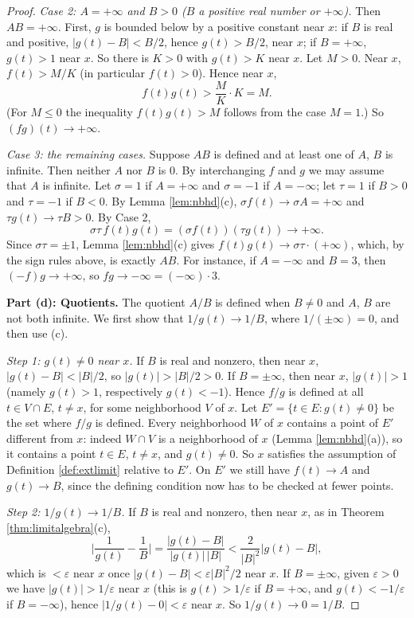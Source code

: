 \documentclass{article}
\theoremstyle{mythm}
\begin{document}
\begin{proof}
\textit{Case 2: $A = +\infty$ and $B > 0$ ($B$ a positive real number or $+\infty$).} Then $AB = +\infty$. First, $g$ is bounded below by a positive constant near $x$: if $B$ is real and positive, $|g(t) - B| < B/2$, hence $g(t) > B/2$, near $x$; if $B = +\infty$, $g(t) > 1$ near $x$. So there is $K > 0$ with $g(t) > K$ near $x$. Let $M > 0$. Near $x$, $f(t) > M/K$ (in particular $f(t) > 0$). Hence near $x$,
\[
f(t)g(t) > \frac{M}{K} \cdot K = M.
\]
(For $M \leq 0$ the inequality $f(t)g(t) > M$ follows from the case $M = 1$.) So $(fg)(t) \to +\infty$.

\textit{Case 3: the remaining cases.} Suppose $AB$ is defined and at least one of $A$, $B$ is infinite. Then neither $A$ nor $B$ is $0$. By interchanging $f$ and $g$ we may assume that $A$ is infinite. Let $\sigma = 1$ if $A = +\infty$ and $\sigma = -1$ if $A = -\infty$; let $\tau = 1$ if $B > 0$ and $\tau = -1$ if $B < 0$. By Lemma \ref{lem:nbhd}(c), $\sigma f(t) \to \sigma A = +\infty$ and $\tau g(t) \to \tau B > 0$. By Case 2,
\[
\sigma\tau\, f(t) g(t) = (\sigma f(t))(\tau g(t)) \to +\infty.
\]
Since $\sigma\tau = \pm 1$, Lemma \ref{lem:nbhd}(c) gives $f(t)g(t) \to \sigma\tau\cdot(+\infty)$, which, by the sign rules above, is exactly $AB$. For instance, if $A = -\infty$ and $B = 3$, then $(-f)g \to +\infty$, so $fg \to -\infty = (-\infty)\cdot 3$.

\textbf{Part (d): Quotients.} The quotient $A/B$ is defined when $B \neq 0$ and $A$, $B$ are not both infinite. We first show that $1/g(t) \to 1/B$, where $1/(\pm\infty) = 0$, and then use (c).

\textit{Step 1: $g(t) \neq 0$ near $x$.} If $B$ is real and nonzero, then near $x$, $|g(t) - B| < |B|/2$, so $|g(t)| > |B|/2 > 0$. If $B = \pm\infty$, then near $x$, $|g(t)| > 1$ (namely $g(t) > 1$, respectively $g(t) < -1$). Hence $f/g$ is defined at all $t \in V \cap E$, $t \neq x$, for some neighborhood $V$ of $x$. Let $E' = \{t \in E : g(t) \neq 0\}$ be the set where $f/g$ is defined. Every neighborhood $W$ of $x$ contains a point of $E'$ different from $x$: indeed $W \cap V$ is a neighborhood of $x$ (Lemma \ref{lem:nbhd}(a)), so it contains a point $t \in E$, $t \neq x$, and $g(t) \neq 0$. So $x$ satisfies the assumption of Definition \ref{def:extlimit} relative to $E'$. On $E'$ we still have $f(t) \to A$ and $g(t) \to B$, since the defining condition now has to be checked at fewer points.

\textit{Step 2: $1/g(t) \to 1/B$.} If $B$ is real and nonzero, then near $x$, as in Theorem \ref{thm:limitalgebra}(c),
\[
\Big|\frac{1}{g(t)} - \frac{1}{B}\Big| = \frac{|g(t) - B|}{|g(t)|\,|B|} < \frac{2}{|B|^2}|g(t) - B|,
\]
which is $< \varepsilon$ near $x$ once $|g(t) - B| < \varepsilon|B|^2/2$ near $x$. If $B = \pm\infty$, given $\varepsilon > 0$ we have $|g(t)| > 1/\varepsilon$ near $x$ (this is $g(t) > 1/\varepsilon$ if $B = +\infty$, and $g(t) < -1/\varepsilon$ if $B = -\infty$), hence $|1/g(t) - 0| < \varepsilon$ near $x$. So $1/g(t) \to 0 = 1/B$.


\end{proof}
\end{document}

